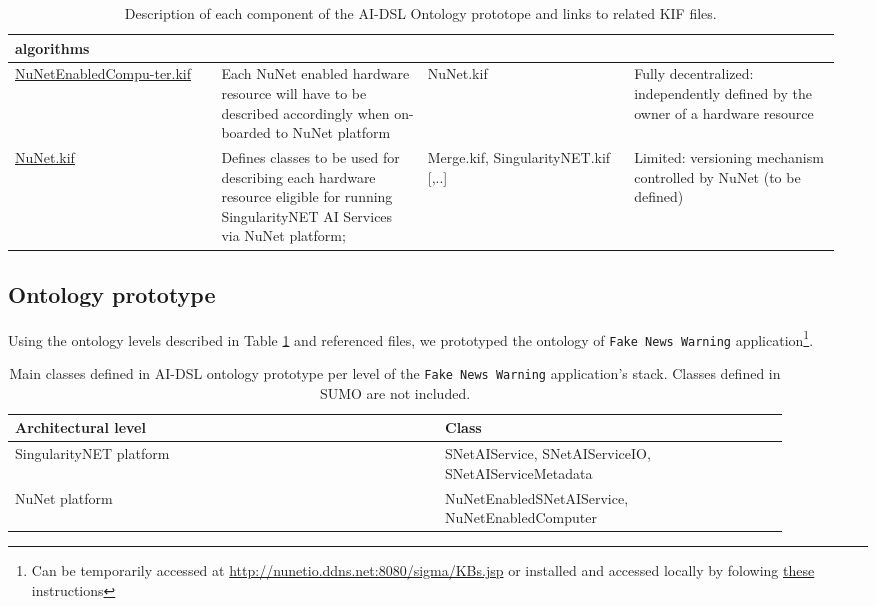 \documentclass[]{report}
\begin{document}
\begin{table}[H]
\begin{tabular}{p{0.24\linewidth}|p{0.24\linewidth}|p{0.24\linewidth}|p{0.24\linewidth}|}
    algorithms \\
    \hline
    \href{https://github.com/singnet/ai-dsl/blob/master/ontology/
    NuNetEnabledComputer.kif}{NuNetEnabledCompu-ter.kif} &
    Each NuNet enabled hardware resource will have to be described accordingly
    when on-boarded to NuNet platform &
    NuNet.kif &
    Fully decentralized: independently defined by the owner of a hardware
    resource \\
    \hline
    \href{https://github.com/singnet/ai-dsl/blob/master/ontology/NuNet.kif}{NuNet.kif} &
    Defines classes to be used for describing each hardware resource eligible
    for running SingularityNET AI Services via NuNet platform;  &
    Merge.kif, SingularityNET.kif [,..]&
    Limited: versioning mechanism controlled by NuNet (to be defined) \\
    \end{tabular}
  \captionsetup{width=0.7\linewidth}
  \caption{\label{tbl:all_kif_files}Description of each component of the AI-DSL Ontology prototope and links to related KIF files.}
\end{table}

\subsection{Ontology prototype}

Using the ontology levels described in Table \ref{tbl:all_kif_files} and
referenced files, we prototyped the ontology of \texttt{Fake News Warning}
application\footnote{Can be temporarily
accessed at \href{http://nunetio.ddns.net:8080/sigma/KBs.jsp}
{http://nunetio.ddns.net:8080/sigma/KBs.jsp} or installed and accessed locally
by folowing \href{https://github.com/nunet-io/ai-dsl/blob/master/ontology/tools/README.md}{these} instructions}.

\begin{table}[H]
  \scriptsize
  \centering
  \begin{tabular}{p{0.5\linewidth}|p{0.4\linewidth}|}
    \textbf{Architectural level} & \textbf{Class} \\
    \hline
    SingularityNET platform & SNetAIService, SNetAIServiceIO,
    SNetAIServiceMetadata\\
    \hline
    NuNet platform & NuNetEnabledSNetAIService, NuNetEnabledComputer\\
  \end{tabular}
  \captionsetup{width=0.9\linewidth}
  \caption{\label{tbl:custom_classes_prototype}Main classes defined in AI-DSL
  ontology prototype per level of the \texttt{Fake News Warning} application's
  stack. Classes defined in SUMO are not included.}
\end{table}
\end{document}
